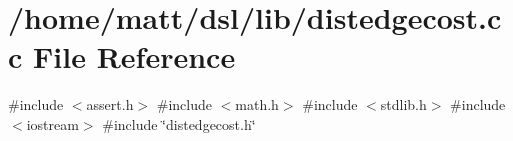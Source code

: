 \section{/home/matt/dsl/lib/distedgecost.cc \-File \-Reference}
\label{distedgecost_8cc}
{\ttfamily \#include $<$assert.\-h$>$}\*
{\ttfamily \#include $<$math.\-h$>$}\*
{\ttfamily \#include $<$stdlib.\-h$>$}\*
{\ttfamily \#include $<$iostream$>$}\*
{\ttfamily \#include \char`\"{}distedgecost.\-h\char`\"{}}\*
